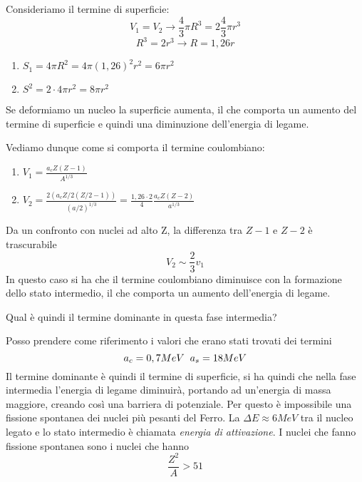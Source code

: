 Consideriamo il termine di superficie:
\begin{equation}
V_1=V_2\to \frac{4}{3}\pi R^3=2\frac{4}{3}\pi r^3
\end{equation}
\begin{equation}
R^3=2r^3\to R=1,26 r
\end{equation}
\begin{enumerate}
\item $S_1=4\pi R^2=4\pi(1,26)^2r^2=6\pi r^2$
\item $S^2=2\cdot 4\pi r^2=8\pi r^2$
\end{enumerate}
Se deformiamo un nucleo la superficie aumenta, il che comporta un aumento del termine di superficie e quindi una diminuzione dell'energia di legame.

Vediamo dunque come si comporta il termine coulombiano:
\begin{enumerate}
\item $V_1=\frac{a_c Z(Z-1)}{A^{1/3}}$
\item $V_2= \frac{2(a_c Z/2 (Z/2-1))}{(a/2)^{1/3}}=\frac{1,26\cdot2}{4}\frac{a_c Z(Z-2)}{a^{1/3}}$
\end{enumerate}
Da un confronto con nuclei ad alto Z, la differenza tra $Z-1$ e $Z-2$ è trascurabile
\begin{equation}
V_2\sim \frac{2}{3} v_1
\end{equation}
In questo caso si ha che il termine coulombiano diminuisce con la formazione dello stato intermedio, il che comporta un aumento dell'energia di legame.

Qual è quindi il termine dominante in questa fase intermedia?

Posso prendere come riferimento i valori che erano stati trovati dei termini
\[
a_c=0,7MeV \hspace{0.2cm}a_s=18MeV
\]
Il termine dominante è quindi il termine di superficie, si ha quindi che nella fase intermedia l'energia di legame diminuirà, portando ad un'energia di massa maggiore, creando così una barriera di potenziale.
Per questo è impossibile una fissione spontanea dei nuclei più pesanti del Ferro.
La $\Delta E\approx 6MeV$ tra il nucleo legato e lo stato intermedio è chiamata \emph{energia di attivazione}.
I nuclei che fanno fissione spontanea sono i nuclei che hanno 
\begin{equation}
\frac{Z^2}{A}>51
\end{equation}

